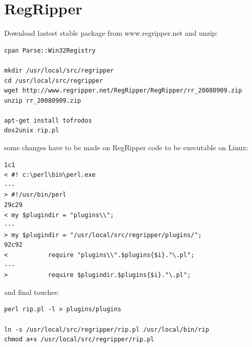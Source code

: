 \documentclass[a4paper,11pt,oneside]{report}
\begin{document}
\section{RegRipper} \label{anx:regripper}

Download lastest stable package from www.regripper.net and unzip:

\begin{verbatim}
cpan Parse::Win32Registry

mkdir /usr/local/src/regripper
cd /usr/local/src/regripper
wget http://www.regripper.net/RegRipper/RegRipper/rr_20080909.zip
unzip rr_20080909.zip

apt-get install tofrodos
dos2unix rip.pl
\end{verbatim}


some changes have to be made on RegRipper code to be executable on Linux:

\begin{verbatim}
1c1
< #! c:\perl\bin\perl.exe
---
> #!/usr/bin/perl
29c29
< my $plugindir = "plugins\\";
---
> my $plugindir = "/usr/local/src/regripper/plugins/";
92c92
< 			require "plugins\\".$plugins{$i}."\.pl";
---
> 			require $plugindir.$plugins{$i}."\.pl";
\end{verbatim}

and final touches:

\begin{verbatim}
perl rip.pl -l > plugins/plugins

ln -s /usr/local/src/regripper/rip.pl /usr/local/bin/rip
chmod a+x /usr/local/src/regripper/rip.pl
\end{verbatim}
\end{document}
